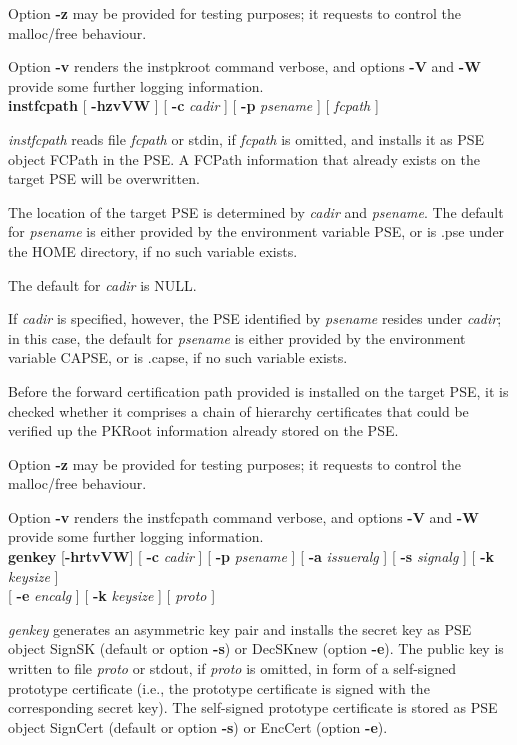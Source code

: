 Option {\bf -z} may be provided for testing purposes; it requests to control the malloc/free behaviour.

Option {\bf -v} renders the instpkroot command verbose, and options {\bf -V} and {\bf -W} 
provide some further logging
information.
\\ [1em] 
{\bf instfcpath} [ {\bf -hzvVW} ] [ {\bf -c} {\em cadir} ] [ {\bf -p} {\em psename} ] [ {\em fcpath} ]

{\em instfcpath} reads file {\em fcpath} or stdin, if {\em fcpath} is omitted, and installs it as
PSE object FCPath in the PSE. A FCPath information that already exists on the target PSE will
be overwritten.
 
The location of the target PSE is determined by {\em cadir} and {\em psename}. The default for {\em 
psename} is either provided by the environment variable PSE, or is .pse under the HOME directory, if no such
variable exists. 

The default for {\em cadir} is NULL. 

If {\em cadir} is specified,
however, the PSE identified by {\em psename} resides under {\em cadir}; in this case, the default
for {\em psename} is either provided by the environment variable CAPSE, or is .capse, if no such variable
exists.

Before the forward certification path provided is installed on the target PSE, it is checked
whether it comprises a chain of hierarchy certificates that could be verified up the PKRoot 
information already stored on the PSE.
 
Option {\bf -z} may be provided for testing purposes; it requests to control the malloc/free behaviour.

Option {\bf -v} renders the instfcpath command verbose, and options {\bf -V} and {\bf -W} 
provide some further logging information.
\\ [1em]
{\bf genkey} [{\bf -hrtvVW}] [ {\bf -c} {\em cadir} ] [ {\bf -p} {\em psename} ] [ {\bf -a} {\em issueralg} ]
[ {\bf -s} {\em signalg} ] [ {\bf -k} {\em keysize} ] \\
\hspace*{2cm} [ {\bf -e} {\em encalg} ] [ {\bf -k} {\em keysize} ] [ {\em proto} ]

{\em genkey} generates an asymmetric key pair and installs the secret key as PSE object
SignSK (default or option {\bf -s}) or DecSKnew (option {\bf -e}). The public key is written to file
{\em proto} or stdout, if {\em proto} is omitted, in form of a self-signed prototype certificate 
(i.e., the prototype certificate is signed with the corresponding secret key). 
The self-signed prototype certificate is stored as PSE object
SignCert (default or option {\bf -s}) or EncCert (option {\bf -e}).

